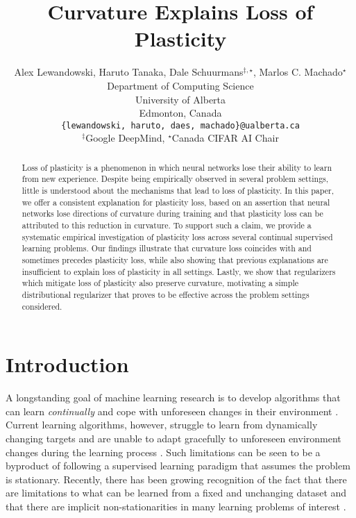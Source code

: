 \documentclass{article}
\title{Curvature Explains Loss of Plasticity}
\author{Alex Lewandowski, Haruto Tanaka, Dale Schuurmans$^{\ddagger, \star}$, Marlos C. Machado$^{\star}$  \\
Department of Computing Science\\
University of Alberta\\
Edmonton, Canada\\
\texttt{\{lewandowski, haruto, daes, machado\}@ualberta.ca} \\
$^{\ddagger}$Google DeepMind, $^{\star}$Canada CIFAR AI Chair\\
}
\begin{document}
\maketitle

\begin{abstract}
  Loss of plasticity is a phenomenon in which neural networks lose their ability to learn from new experience.
  Despite being empirically observed in several problem settings, little is understood about the mechanisms that lead to loss of plasticity.
  In this paper, we offer a consistent explanation for plasticity loss,
  based on an assertion that neural networks lose directions of curvature during training and that plasticity loss can be attributed to this reduction in curvature.
  To support such a claim, we provide a systematic empirical investigation of plasticity loss across several continual supervised learning problems.
  Our findings illustrate that curvature loss  coincides with and sometimes precedes plasticity loss, while also showing that previous explanations are insufficient to explain loss of plasticity in all settings.
  Lastly, we show that regularizers which mitigate loss of plasticity also preserve curvature, motivating a simple distributional regularizer that proves to be effective across the problem settings considered.
\end{abstract}
\vspace{-4mm}

\section{Introduction}
\vspace{-2mm}

A longstanding goal of machine learning research is to develop algorithms that can learn \textit{continually} and cope  with unforeseen changes in their environment  \citep{sutton07}.
Current learning algorithms, however,  struggle to learn from dynamically changing targets and are unable to adapt gracefully to unforeseen environment changes during the learning process \citep{zilly21,abbas23_loss_plast_contin_deep_reinf_learn,lyle23_under,dohare23_maint_plast_deep_contin_learn}.
Such limitations can be seen to be a byproduct of following a supervised learning paradigm that  assumes  the problem is stationary.
Recently, there has been growing recognition of the fact
that there are limitations to what can be learned from a fixed and 
unchanging dataset \citep{hoffmann22} and that there are implicit non-stationarities in many learning problems of interest \citep{igl21_trans_non_gener_deep_reinf_learn}.
\end{document}
